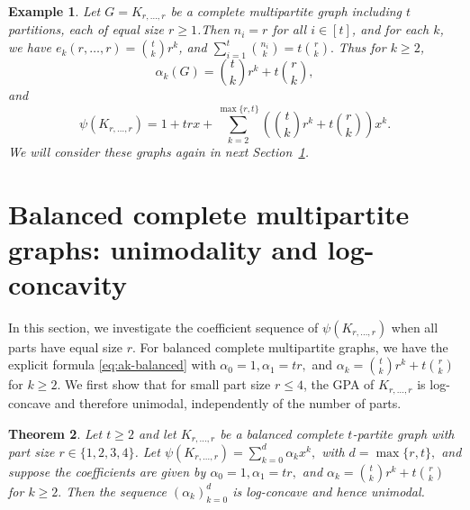 \documentclass[12pt,twoside]{article}
\newtheorem{theorem}{Theorem}[section]
\newtheorem{example}[theorem]{Example}
\begin{document}
	\begin{example}
		Let \(G=K_{r,\dots,r}\) be a complete multipartite graph including \(t\) partitions, each of equal size \(r\ge 1\).Then \(n_i=r\) for all \(i\in[t]\), and for each \(k\), we have $e_k(r,\dots,r)	= \binom{t}{k}r^k$, and  $\sum_{i=1}^t \binom{n_i}{k} = t\binom{r}{k}.$	Thus for \(k\ge 2\),
		\begin{equation}\label{eq:ak-balanced}
			\alpha_k(G)
			= \binom{t}{k}r^k + t\binom{r}{k},
		\end{equation}
		and
		\begin{equation}\label{eq:psi-balanced}
			\psi(K_{r,\dots,r})
			= 1 + trx + \sum_{k=2}^{\max\{r,t\}}
			\left(\binom{t}{k}r^k + t\binom{r}{k}\right)x^k.
		\end{equation}
		We will consider these graphs again in next Section~\ref{sec:balanced}.
	\end{example}
	
	\section{Balanced complete multipartite graphs: unimodality and log-concavity}
	\label{sec:balanced}
	
	In this section, we investigate the coefficient sequence of \(\psi(K_{r,\dots,r})\) when all parts have equal size \(r\).  For balanced complete multipartite graphs, we have the explicit formula \eqref{eq:ak-balanced} with $\alpha_0=1, \alpha_1=tr, $ and $\alpha_k = \binom{t}{k}r^k + t\binom{r}{k}$ for $k\ge 2.$ We first show that for small part size \(r\le 4\), the GPA of \(K_{r,\dots,r}\) is log-concave and therefore unimodal, independently of the number of parts. 

	\begin{theorem}\label{thm:balanced-small-r}
		Let $t\ge 2$ and let $K_{r,\dots,r}$ be a balanced complete $t$-partite graph
		with part size $r\in\{1,2,3,4\}$. Let $\psi(K_{r,\dots,r})=\sum_{k=0}^d \alpha_k x^k,$ with $d=\max\{r,t\},$ and suppose the coefficients are given by $\alpha_0=1,\alpha_1=tr, $ and $\alpha_k = \binom{t}{k}r^k + t\binom{r}{k}$ for $k\ge 2.$ Then the sequence $(\alpha_k)_{k=0}^d$ is log-concave and hence unimodal.
	\end{theorem}
	
\end{document}
